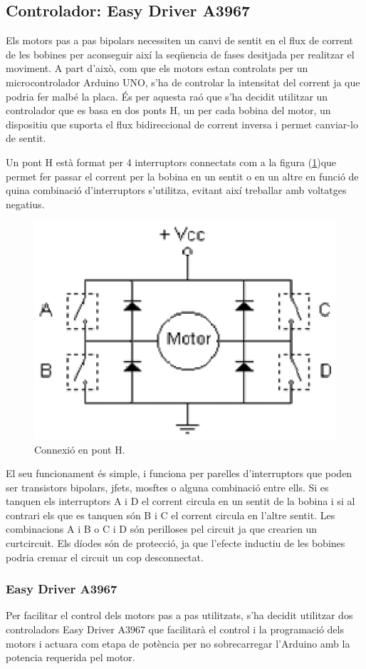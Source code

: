\subsection{Controlador: Easy Driver A3967}

Els motors pas a pas bipolars necessiten un canvi de sentit en el flux de corrent  de les bobines per aconseguir així la seqüencia de fases desitjada per realitzar el moviment. A part d'això, com que els motors estan controlats per un microcontrolador Arduino UNO, s'ha de controlar la intensitat del corrent ja que podria fer malbé la placa. És per aquesta raó que s'ha decidit utilitzar un controlador que es basa en dos ponts H, un per cada bobina del motor, un dispositiu que suporta el flux bidireccional de corrent inversa i permet  canviar-lo de sentit.


Un pont H està format per 4 interruptors connectats com a la figura (\ref{fig:ponth})que permet fer passar el corrent per la bobina en un sentit o en un altre en funció de quina combinació d'interruptors s'utilitza, evitant així treballar amb voltatges negatius.

\begin{figure}[H]
	\centering
	\includegraphics[width=0.40\linewidth]{PontH.eps}
	\caption{Connexió en pont H.}
	\label{fig:ponth}
\end{figure}

El seu funcionament és simple, i funciona per parelles d'interruptors que poden ser transistors bipolars, jfets, mosftes o alguna combinació entre ells. Si es tanquen els interruptors A i D el corrent circula en un sentit de la bobina i si al contrari els que es tanquen són B i C el corrent circula en l'altre sentit. Les combinacions A i B o C i D són perilloses pel circuit ja que crearien un curtcircuit. Els díodes són de protecció, ja que l'efecte inductiu de les bobines podria cremar el circuit un cop desconnectat.


\subsubsection{Easy Driver A3967}
Per facilitar el control dels motors pas a pas utilitzats, s'ha decidit utilitzar dos controladors Easy Driver A3967 que facilitarà el control i la programació dels motors i actuara com etapa de potència per no sobrecarregar l'Arduino amb la potencia requerida pel motor.


